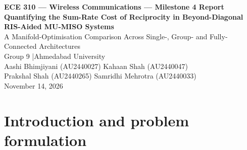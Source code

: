 \documentclass[10pt,a4paper]{article}
\newcommand{\bpsHz}{bps/Hz}
\newcommand{\THT}{\boldsymbol{\Theta}}
\begin{document}
\begin{center}
{\large\bfseries ECE 310 --- Wireless Communications --- Milestone 4 Report}\\[6pt]
{\Large\bfseries Quantifying the Sum-Rate Cost of Reciprocity in Beyond-Diagonal RIS-Aided MU-MISO Systems}\\[4pt]
{\large A Manifold-Optimisation Comparison Across Single-, Group- and Fully-Connected Architectures}\\[8pt]
Group 9 \quad|\quad Ahmedabad University\\[4pt]
Aashi Bhimjiyani (AU2440027) \quad Kahaan Shah (AU2440047)\\
Prakshal Shah (AU2440265) \quad Samridhi Mehrotra (AU2440033)\\[4pt]
November 14, 2026
\end{center}

\begin{abstract}\noindent
A lossless passive beyond-diagonal RIS (BD-RIS) has a unitary scattering matrix ($\THT^H\THT=\mathbf I$); if it is built from reciprocal components, $\THT$ must also be symmetric ($\THT=\THT^T$). This report quantifies the sum-rate lost to that extra constraint in a downlink MU-MISO system with a blocked direct link. A reciprocal design (Riemannian conjugate-gradient ascent with a symmetry penalty and an exact final symmetric-unitary projection) is compared with a general, non-reciprocal baseline on identical channels, start matrices and frozen MMSE precoders, so any rate difference is attributable to the symmetry constraint. Fifty-draw experiments cover transmit power, number of antennas and users, RIS size, group-connected block size and Rician fading, with diagnostics of the optimiser (iteration cap, penalty weight). The cost of reciprocity is exactly zero for single-connected (SC) RIS, between $0.10$ and $0.16$\,\bpsHz\ (1--9\,\% of the rate) for group-connected (GC) RIS with block size 4, and between $0.005$ and $0.11$\,\bpsHz\ (0.1--0.8\,\%) for fully-connected (FC) RIS at $N{=}K{=}2$. The GC cost grows strongly with the number of users ($0.59\to1.68$\,\bpsHz\ for $N{=}K{=}3\to6$), shrinks as the GC block size grows, and is largely independent of $R$. Reciprocity is therefore nearly free when the RIS blocks are large compared with $N{+}K$ and costly when they are small. Some low-power results are partly optimiser-limited, and the report states which.
\end{abstract}

\section{Introduction and problem formulation}
\end{document}
